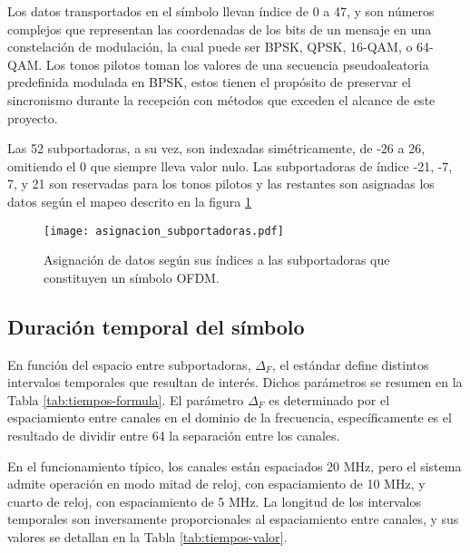 Los datos transportados en el símbolo llevan índice de 0 a 47, y son números complejos que representan las coordenadas de los bits de un mensaje en una constelación de modulación, la cual puede ser BPSK, QPSK, 16-QAM, o 64-QAM. Los tonos pilotos toman los valores de una secuencia pseudoaleatoria predefinida modulada en BPSK, estos tienen el propósito de preservar el sincronismo durante la recepción con métodos que exceden el alcance de este proyecto.

Las 52 subportadoras, a su vez, son indexadas simétricamente, de -26 a 26, omitiendo el 0 que siempre lleva valor nulo. Las subportadoras de índice -21, -7, 7, y 21 son reservadas para los tonos pilotos y las restantes son asignadas los datos según el mapeo descrito en la figura \ref{fig:asignacion-subportadoras}
\begin{figure}[t]
    \centering{}\texttt{[image: asignacion\_subportadoras.pdf]}
    \caption{Asignación de datos según sus índices a las subportadoras que constituyen un símbolo OFDM.\label{fig:asignacion-subportadoras}}  
\end{figure}

\subsection{Duración temporal del símbolo}
\label{Ss:ch2-tiempo-simbolo}


En función del espacio entre subportadoras, $\Delta_F$, el estándar define distintos intervalos temporales que resultan de interés. Dichos parámetros se resumen en la Tabla \ref{tab:tiempos-formula}. El parámetro $\Delta_F$ es determinado por el espaciamiento entre canales en el dominio de la frecuencia, específicamente es el resultado de dividir entre 64 la separación entre los canales.

En el funcionamiento típico, los canales están espaciados 20 MHz, pero el sistema admite operación en modo mitad de reloj, con espaciamiento de 10 MHz, y cuarto de reloj, con espaciamiento de 5 MHz. La longitud de los intervalos temporales son inversamente proporcionales al espaciamiento entre canales, y sus valores se detallan en la Tabla \ref{tab:tiempos-valor}.

